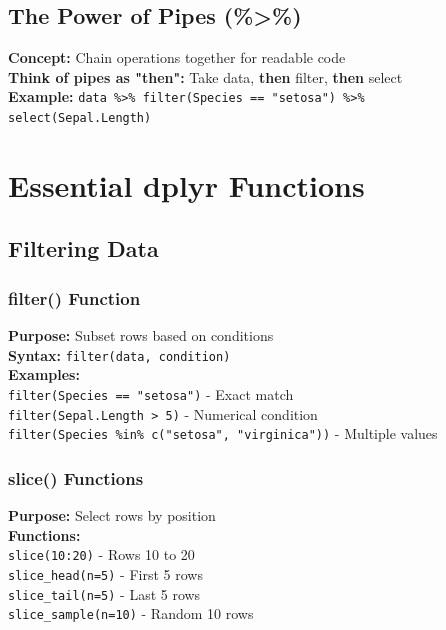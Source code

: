 \documentclass[11pt,a4paper]{article}
\begin{document}
\subsection{The Power of Pipes (\%>\%)}

\begin{formulabox}
\textbf{Concept:} Chain operations together for readable code\\[0.3cm]
\textbf{Think of pipes as "then":} Take data, \textbf{then} filter, \textbf{then} select\\[0.3cm]
\textbf{Example:} \texttt{data \%>\% filter(Species == "setosa") \%>\% select(Sepal.Length)}
\end{formulabox}

\section{Essential dplyr Functions}

\subsection{Filtering Data}

\subsubsection{filter() Function}

\begin{formulabox}
\textbf{Purpose:} Subset rows based on conditions\\[0.3cm]
\textbf{Syntax:} \texttt{filter(data, condition)}\\[0.3cm]
\textbf{Examples:}\\
\texttt{filter(Species == "setosa")} - Exact match\\
\texttt{filter(Sepal.Length > 5)} - Numerical condition\\
\texttt{filter(Species \%in\% c("setosa", "virginica"))} - Multiple values
\end{formulabox}

\subsubsection{slice() Functions}

\begin{formulabox}
\textbf{Purpose:} Select rows by position\\[0.3cm]
\textbf{Functions:}\\
\texttt{slice(10:20)} - Rows 10 to 20\\
\texttt{slice\_head(n=5)} - First 5 rows\\
\texttt{slice\_tail(n=5)} - Last 5 rows\\
\texttt{slice\_sample(n=10)} - Random 10 rows
\end{formulabox}
\end{document}
